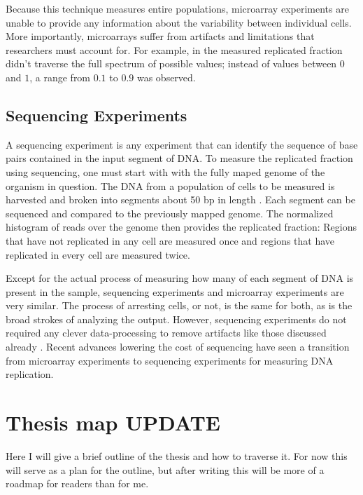 		Because this technique measures entire populations, microarray experiments are unable to provide any information about the variability between individual cells.
		More importantly, microarrays suffer from artifacts and limitations that researchers must account for.
		For example, in \cite{McCuneMicroArray} the measured replicated fraction didn't traverse the full spectrum of possible values; instead of values between $0$ and $1$, a range from $0.1$ to $0.9$ was observed.
		
		\subsection{Sequencing Experiments}
		\label{subsec:Sequencing}
		
		A sequencing experiment is any experiment that can identify the sequence of base pairs contained in the input segment of DNA.
		To measure the replicated fraction using sequencing, one must start with with the fully maped genome of the organism in question.
		The DNA from a population of cells to be measured is harvested and broken into segments about 50 bp in length \cite{StochasticTermination}.
		Each segment can be sequenced and compared to the previously mapped genome.
		The normalized histogram of reads over the genome then provides the replicated fraction:
		Regions that have not replicated in any cell are measured once and regions that have replicated in every cell are measured twice.
		
		Except for the actual process of measuring how many of each segment of DNA is present in the sample, sequencing experiments and microarray experiments are very similar.
		The process of arresting cells, or not, is the same for both, as is the broad strokes of analyzing the output.
		However, sequencing experiments do not required any clever data-processing to remove artifacts like those discussed already \cite{EndOfMicroarray}.
		Recent advances lowering the cost of sequencing have seen a transition from microarray experiments to sequencing experiments for measuring DNA replication.
		
	\section{Thesis map \textbf{UPDATE}}
	\label{sec:Map}

	Here I will give a brief outline of the thesis and how to traverse it. For now this will serve as a plan for the outline, but after writing this will be more of a roadmap for readers than for me.
	
